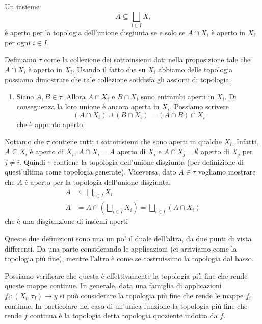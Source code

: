 \documentclass[a4paper]{article}
\begin{document}
\begin{snippetproposition}{}
    Un insieme
    \[
        A \subseteq \bigsqcup_{i\in I} X_i
    \]
    è aperto per la topologia dell'unione disgiunta se e solo se
    \(A \cap X_i\) è aperto in \(X_i\) per ogni \(i \in I\).
\end{snippetproposition}

\begin{snippetproof}{}
    Definiamo \(\tau\) come la collezione dei sottoinsiemi dati nella proposizione
    tale che \(A \cap X_i\) è aperto in \(X_i\).
    Usando il fatto che su \(X_i\) abbiamo delle topologia possiamo dimostrare
    che tale collezione soddisfa gli assiomi di topologia:
    \begin{enumerate}
        \item Siano \(A, B \in \tau\).
        Allora \(A \cap X_i\) e \(B \cap X_i\) sono entrambi aperti in \(X_i\).
        Di conseguenza la loro unione è ancora aperta in \(X_i\). Possiamo scrivere
        \[
            (A \cap X_i) \cup (B \cap X_i) = (A \cap B) \cap X_i
        \]
        che è appunto aperto.
    \end{enumerate}
    Notiamo che \(\tau\) contiene tutti i sottoinsiemi che sono aperti
    in qualche \(X_i\).
    Infatti, \(A \subseteq X_i\) è aperto di \(X_i\),
    \(A \cap X_i = A\) aperto di \(X_i\)
    e \(A \cap X_j = \emptyset\) aperto di \(X_j\) per \(j \neq i\).
    Quindi \(\tau\) contiene la topologia dell'unione disgiunta
    (per definizione di quest'ultima come topologia generate).
    Viceversa, dato \(A \in \tau\) vogliamo mostrare che \(A\)
    è aperto per la topologia dell'unione disgiunta.
    \begin{align*}
        A &\subseteq \bigsqcup_{i\in I} X_i \\
        A &= A \cap \left(\bigsqcup_{i\in I} X_i\right)
        = \bigsqcup_{i\in I} (A \cap X_i)
    \end{align*}
    che è una disgiunzione di insiemi aperti 
\end{snippetproof}

Queste due definizioni sono una un po' il duale dell'altra,
da due punti di vista differenti.
Da una parte considerando le applicazioni (ci arriviamo come la topologia più fine),
mentre l'altro è come se costruissimo la topologia dal basso.

Possiamo verificare che questa è effettivamente la topologia più fine che rende queste mappe continue.  
In generale, data una famiglia di applicazioni \(f_i \colon (X_i, \tau_I) \to y\)
si può considerare la topologia più fine che rende le mappe \(f_i\)
continue.
In particolare nel caso di un'unica funzione
la topologia più fine che rende \(f\)
continua è la topologia detta topologia quoziente indotta da \(f\).
\end{document}
